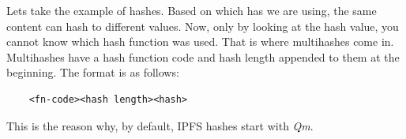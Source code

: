 Lets take the example of hashes. Based on which has we are using, the same content can hash to different values. Now, only by looking at the hash value, you cannot know which hash function was used. That is where multihashes come in. Multihashes have a hash function code and hash length appended to them at the beginning. The format is as follows:

\begin{verbatim}
    <fn-code><hash length><hash>
\end{verbatim}

This is the reason why, by default, IPFS hashes start with \textit{Qm}.
